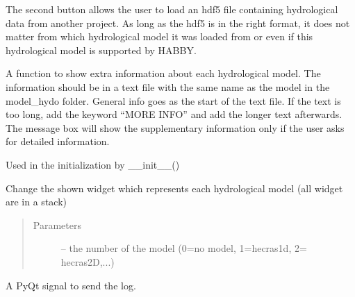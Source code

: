 \documentclass[letterpaper,10pt,english]{sphinxmanual}
\begin{document}
\begin{fulllineitems}
\begin{itemize}
\end{itemize}

The second button allows the user to load an hdf5 file containing hydrological data from another project.
As long as the hdf5 is in the right format, it does not matter from which hydrological model it was loaded from
or even if this hydrological model is supported by HABBY.

\begin{fulllineitems}
\label{\detokenize{index:src_GUI.hydro_GUI_2.Hydro2W.give_info_model}}
A function to show extra information about each hydrological model.
The information should be in a text file with the same name as the model in the model\_hydo folder.
General info goes as the start of the text file. If the text is too long, add the keyword ``MORE INFO''
and add the longer text afterwards. The message box will show the supplementary information only if the user
asks for detailed information.

\end{fulllineitems}


\begin{fulllineitems}
\label{\detokenize{index:src_GUI.hydro_GUI_2.Hydro2W.init_iu}}
Used in the initialization by \_\_init\_\_()

\end{fulllineitems}


\begin{fulllineitems}
\label{\detokenize{index:src_GUI.hydro_GUI_2.Hydro2W.selectionchange}}
Change the shown widget which represents each hydrological model (all widget are in a stack)
\begin{quote}\begin{description}
\item[{Parameters}] \leavevmode
{} -- the number of the model (0=no model, 1=hecras1d, 2= hecras2D,...)

\end{description}\end{quote}

\end{fulllineitems}


\begin{fulllineitems}
\label{\detokenize{index:src_GUI.hydro_GUI_2.Hydro2W.send_log}}
A PyQt signal to send the log.

\end{fulllineitems}


\end{fulllineitems}
\end{document}
